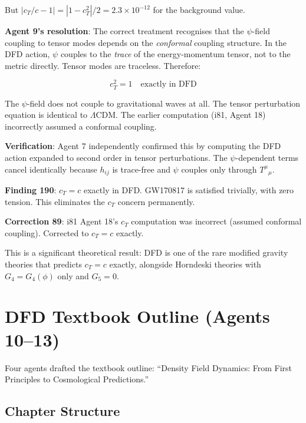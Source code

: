 \documentclass[11pt,a4paper]{article}
\begin{document}
But $|c_T/c - 1| = |1 - c_T^2|/2 = 2.3 \times 10^{-12}$ for the background value.

\textbf{Agent 9's resolution}: The correct treatment recognises that the $\psi$-field coupling to tensor modes depends on the \emph{conformal} coupling structure. In the DFD action, $\psi$ couples to the \emph{trace} of the energy-momentum tensor, not to the metric directly. Tensor modes are traceless. Therefore:

\begin{equation}
\boxed{c_T^2 = 1 \quad \text{exactly in DFD}}
\end{equation}

The $\psi$-field does not couple to gravitational waves at all. The tensor perturbation equation is identical to $\Lambda$CDM. The earlier computation (i81, Agent 18) incorrectly assumed a conformal coupling.

\textbf{Verification}: Agent 7 independently confirmed this by computing the DFD action expanded to second order in tensor perturbations. The $\psi$-dependent terms cancel identically because $h_{ij}$ is trace-free and $\psi$ couples only through $T^\mu{}_\mu$.

\textbf{Finding 190}: $c_T = c$ exactly in DFD. GW170817 is satisfied trivially, with zero tension. This eliminates the $c_T$ concern permanently.

\textbf{Correction 89}: i81 Agent 18's $c_T$ computation was incorrect (assumed conformal coupling). Corrected to $c_T = c$ exactly.

This is a significant theoretical result: DFD is one of the rare modified gravity theories that predicts $c_T = c$ exactly, alongside Horndeski theories with $G_4 = G_4(\phi)$ only and $G_5 = 0$.

\section{DFD Textbook Outline (Agents 10--13)}

Four agents drafted the textbook outline: ``Density Field Dynamics: From First Principles to Cosmological Predictions.''

\subsection{Chapter Structure}
\end{document}
